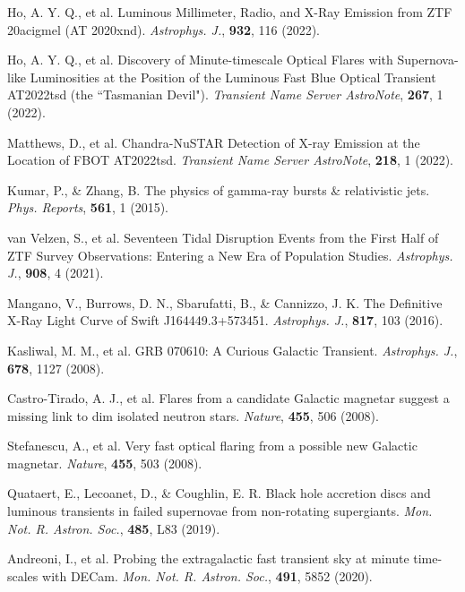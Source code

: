 \documentclass{nature_plusfigure}
\newcommand{\mn}{{Mon. Not. R. Astron. Soc.}}
\newcommand{\physrep}{{Phys. Reports}}
\newcommand{\mnras}{\mn}
\newcommand{\apj}{{Astrophys. J.}}
\newcommand{\nat}{{Nature}}
\begin{document}
\begin{thebibliography}{100}
 Ho, A. Y. Q., et al. Luminous Millimeter, Radio, and X-Ray Emission from ZTF 20acigmel (AT 2020xnd). \emph{\apj}, \textbf{932}, 116 (2022). 


 Ho, A. Y. Q., et al. Discovery of Minute-timescale Optical Flares with Supernova-like Luminosities at the Position of the Luminous Fast Blue Optical Transient AT2022tsd (the ``Tasmanian Devil"). \emph{Transient Name Server AstroNote}, \textbf{267}, 1 (2022). 

 Matthews, D., et al. Chandra-NuSTAR Detection of X-ray Emission at the Location of FBOT AT2022tsd. \emph{Transient Name Server AstroNote}, \textbf{218}, 1 (2022). 


 Kumar, P., \& Zhang, B. The physics of gamma-ray bursts \& relativistic jets. \emph{\physrep}, \textbf{561}, 1 (2015). 

 van Velzen, S., et al. Seventeen Tidal Disruption Events from the First Half of ZTF Survey Observations: Entering a New Era of Population Studies. \emph{\apj}, \textbf{908}, 4 (2021). 

 Mangano, V., Burrows, D. N., Sbarufatti, B., \& Cannizzo, J. K. The Definitive X-Ray Light Curve of Swift J164449.3+573451. \emph{\apj}, \textbf{817}, 103 (2016). 

 Kasliwal, M. M., et al. GRB 070610: A Curious Galactic Transient. \emph{\apj}, \textbf{678}, 1127 (2008). 

 Castro-Tirado, A. J., et al. Flares from a candidate Galactic magnetar suggest a missing link to dim isolated neutron stars. \emph{\nat}, \textbf{455}, 506 (2008). 

 Stefanescu, A., et al. Very fast optical flaring from a possible new Galactic magnetar. \emph{\nat}, \textbf{455}, 503 (2008). 


 Quataert, E., Lecoanet, D., \& Coughlin, E. R. Black hole accretion discs and luminous transients in failed supernovae from non-rotating supergiants. \emph{\mnras}, \textbf{485}, L83 (2019). 


 Andreoni, I., et al. Probing the extragalactic fast transient sky at minute time-scales with DECam. \emph{\mnras}, \textbf{491}, 5852 (2020). 


\end{thebibliography}
\end{document}
